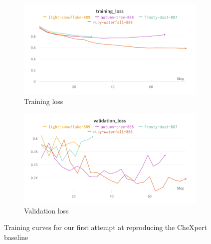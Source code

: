 \documentclass[11pt]{article}
\begin{document}
                \begin{figure}[H]
                     \centering
                     \begin{subfigure}[b]{0.45\textwidth}
                         \centering
                         \includegraphics[width=\textwidth]{plots/chexpert_training_loss1}
                         \caption{Training loss}
                         \vspace{4ex}
                         \label{fig:chexpert_training_loss1}
                     \end{subfigure}
                     \hfill
                     \begin{subfigure}[b]{0.45\textwidth}
                         \centering
                         \includegraphics[width=\textwidth]{plots/chexpert_validation_loss1}
                         \caption{Validation loss}
                         \vspace{4ex}
                         \label{fig:chexpert_validation_loss1}
                     \end{subfigure}
                     \label{fig:chexpert_training_curve1}
                     \caption{Training curves for our first attempt at reproducing the CheXpert baseline}
                \end{figure}
\end{document}
